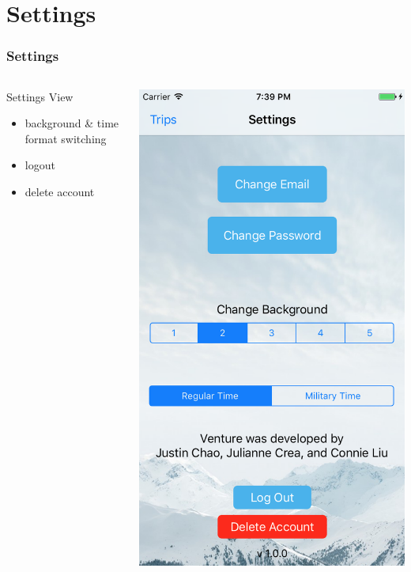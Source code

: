 \documentclass{beamer}
\begin{document}
\section{Settings}
\begin{frame}
\frametitle{Settings}
\begin{columns}
    \begin{column}{0.3\textwidth}
        Settings View
        \begin{itemize}
            \item background \& time format switching
            \item logout
            \item delete account
        \end{itemize}
    \end{column}
    \begin{column}{0.3\textwidth}  %
        \begin{center}
            \includegraphics[scale=0.3]{settings}

\end{center}
\end{column}
\end{columns}
\end{frame}
\end{document}
